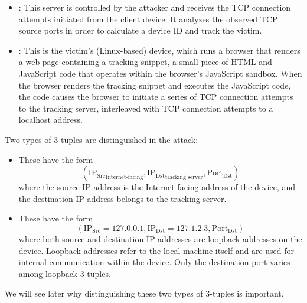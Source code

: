 \documentclass[twocolumn]{report}
\begin{document}
\begin{itemize}
	\item {}: This server is controlled by the \alert{attacker} and receives the TCP connection attempts initiated from the client device. It analyzes the observed TCP source ports in order to calculate a device ID and track the victim.%

	\item {}: This is the \alert{victim’s} (Linux-based) device, which runs a browser that renders a web page containing a \alert{tracking snippet}, a small piece of HTML and JavaScript code that operates within the browser’s JavaScript sandbox. When the browser renders the tracking snippet and executes the JavaScript code, the code causes the browser to initiate a series of TCP connection attempts to the \alert{tracking server}, interleaved with TCP connection attempts to a \alert{localhost address}.
\end{itemize}

Two \alert{types of 3-tuples} are distinguished in the attack:

\begin{itemize}
	\item {} These have the form
	\begin{equation*}
		(\mathrm{IP_{Src}}_{\text{Internet-facing}}, \mathrm{IP_{Dst}}_{\text{tracking server}}, \mathrm{Port_{Dst}})
	\end{equation*}
	where the source IP address is the Internet-facing address of the device, and the destination IP address belongs to the tracking server.

	\item {} These have the form
	\begin{equation*}
		(\mathrm{IP_{Src}} = 127.0.0.1, \mathrm{IP_{Dst}} = 127.1.2.3, \mathrm{Port_{Dst}})
	\end{equation*}
	where both source and destination IP addresses are loopback addresses on the device. \alert{Loopback addresses} refer to the local machine itself and are used for internal communication within the device. Only the \alert{destination port} varies among loopback 3-tuples.
\end{itemize}

We will see later why distinguishing these two types of 3-tuples is important.
\end{document}

